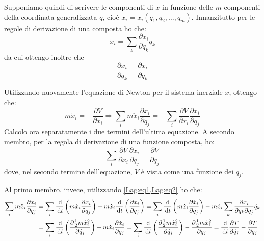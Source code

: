 \documentclass[../main.tex]{subfiles}
\begin{document}
Supponiamo quindi di scrivere le componenti di $x$ in funzione delle $m$ componenti della coordinata generalizzata $q$, cioè $x_i=x_i(q_1,q_2,\dots,q_m)$. Innanzitutto per le regole di derivazione di una composta ho che:
\begin{equation}\label{Lag:eq1}
	\dot x_i=\sum_k \frac{\partial x_i}{\partial q_k}\dot q_k
\end{equation}
da cui ottengo inoltre che 
\begin{equation}\label{Lag:eq2}
	\frac{\partial \dot x_i}{\partial \dot q_k}=\frac{\partial x_i}{\partial q_k}
\end{equation}

Utilizzando nuovamente l'equazione di Newton per il sistema inerziale $x$, ottengo che:
\begin{equation*}
	m \ddot x_i=-\frac{\partial V}{\partial x_i} \Longrightarrow \sum_i m \ddot x_i \frac{\partial x_i}{\partial q_j}=-\sum_i\frac{\partial V}{\partial x_i} \frac{\partial x_i}{\partial q_j}
\end{equation*}
Calcolo ora separatamente i due termini dell'ultima equazione. A secondo membro, per la regola di derivazione di una funzione composta, ho:
\begin{equation}\label{Lag:ParzialePotenziale}
	\sum_i\frac{\partial V}{\partial x_i} \frac{\partial x_i}{\partial q_j}=\frac{\partial V}{\partial q_j}
\end{equation}
dove, nel secondo termine dell'equazione, $V$ è vista come una funzione dei $q_j$.

Al primo membro, invece, utilizzando \cref{Lag:eq1,Lag:eq2} ho che:
\begin{equation}\label{Lag:ParzialeCinetica}\begin{split}
	\sum_i m \ddot x_i \frac{\partial x_i}{\partial q_j} &=
	\sum_i \frac{\,\mathrm{d}}{\,\mathrm{d} t}\left(m \dot x_i \frac{\partial x_i}{\partial q_j}\right) - m \dot x_i\frac{\,\mathrm{d}}{\,\mathrm{d} t}\left( \frac{\partial x_i}{\partial q_j}\right)= 
	\sum_i \frac{\,\mathrm{d}}{\,\mathrm{d} t}\left(m \dot x_i \frac{\partial \dot x_i}{\partial \dot q_j}\right) - m \dot x_i\sum_k\frac{\partial x_i}{\partial q_k\partial q_j}\dot q_k\\
	& = \sum_i \frac{\,\mathrm{d}}{\,\mathrm{d} t}\left(\frac{\partial \frac 12 m \dot x_i^2}{\partial \dot q_j}\right) - m \dot x_i\frac{\partial \dot x_i}{\partial q_j} =
	\sum_i \frac{\,\mathrm{d}}{\,\mathrm{d} t}\left(\frac{\partial \frac 12 m \dot x_i^2}{\partial \dot q_j}\right) - \frac{\partial \frac 12 m \dot x_i^2}{\partial q_j} =\frac{\,\mathrm{d}}{\,\mathrm{d} t}\frac{\partial T}{\partial \dot q_j} - \frac{\partial T}{\partial q_j}
\end{split}\end{equation}
\end{document}

